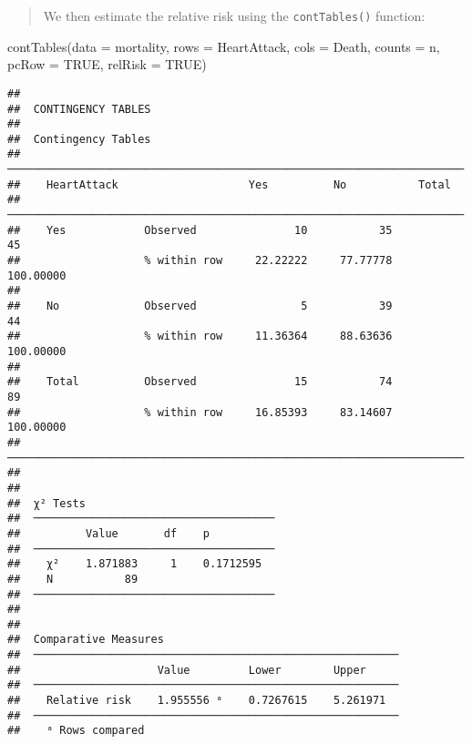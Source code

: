 \documentclass[
]{memoir}
\newenvironment{Shaded}{\begin{snugshade}}{\end{snugshade}}
\newcommand{\AttributeTok}[1]{\textcolor[rgb]{0.77,0.63,0.00}{#1}}
\newcommand{\ConstantTok}[1]{\textcolor[rgb]{0.00,0.00,0.00}{#1}}
\newcommand{\FunctionTok}[1]{\textcolor[rgb]{0.00,0.00,0.00}{#1}}
\newcommand{\NormalTok}[1]{#1}
\begin{document}
\begin{quote}
We then estimate the relative risk using the \texttt{contTables()} function:
\end{quote}

\begin{Shaded}
\begin{Highlighting}[]
\FunctionTok{contTables}\NormalTok{(}\AttributeTok{data =}\NormalTok{ mortality,}
           \AttributeTok{rows =}\NormalTok{ HeartAttack, }\AttributeTok{cols =}\NormalTok{ Death,}
           \AttributeTok{counts =}\NormalTok{ n,}
           \AttributeTok{pcRow =} \ConstantTok{TRUE}\NormalTok{, }\AttributeTok{relRisk =} \ConstantTok{TRUE}\NormalTok{)}
\end{Highlighting}
\end{Shaded}

\begin{verbatim}
## 
##  CONTINGENCY TABLES
## 
##  Contingency Tables                                                     
##  ────────────────────────────────────────────────────────────────────── 
##    HeartAttack                    Yes          No           Total       
##  ────────────────────────────────────────────────────────────────────── 
##    Yes            Observed               10           35           45   
##                   % within row     22.22222     77.77778    100.00000   
##                                                                         
##    No             Observed                5           39           44   
##                   % within row     11.36364     88.63636    100.00000   
##                                                                         
##    Total          Observed               15           74           89   
##                   % within row     16.85393     83.14607    100.00000   
##  ────────────────────────────────────────────────────────────────────── 
## 
## 
##  χ² Tests                              
##  ───────────────────────────────────── 
##          Value       df    p           
##  ───────────────────────────────────── 
##    χ²    1.871883     1    0.1712595   
##    N           89                      
##  ───────────────────────────────────── 
## 
## 
##  Comparative Measures                                     
##  ──────────────────────────────────────────────────────── 
##                     Value         Lower        Upper      
##  ──────────────────────────────────────────────────────── 
##    Relative risk    1.955556 ᵃ    0.7267615    5.261971   
##  ──────────────────────────────────────────────────────── 
##    ᵃ Rows compared
\end{verbatim}
\end{document}
